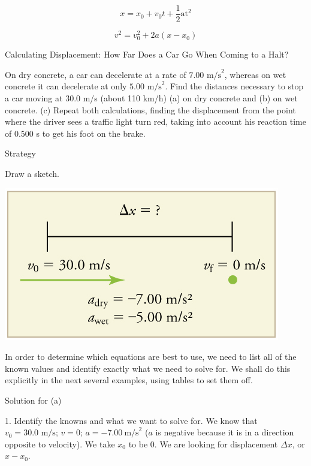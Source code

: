 \documentclass[
]{book}
\begin{document}
\leavevmode{}%
\[{{x = {x_{0} + v_{0}}}{t + \frac{1}{2}}\text{at}^{2}}{}\]

\leavevmode{}%
\[{{v^{2} = {v_{0}^{2} + 2a}}\left( {x - x_{0}} \right)}{}\]

\hypertarget{fs-id1164906424692}{}
Calculating Displacement: How Far Does a Car Go When Coming to a Halt?

On dry concrete, a car can decelerate at a rate of
\({7\text{.}\text{00\ m/s}^{2}}{}\), whereas on wet concrete it can
decelerate at only \({5\text{.}\text{00\ m/s}^{2}}{}\). Find the distances
necessary to stop a car moving at 30.0
m/s\emph{} (about 110 km/h) (a) on dry concrete
and (b) on wet concrete. (c) Repeat both calculations, finding the
displacement from the point where the driver sees a traffic light turn
red, taking into account his reaction time of 0.500 s to get his foot on
the brake.

{Strategy}

Draw a sketch.

\includegraphics{images/Figure_02_04_02c.jpg}

In order to determine which equations are best to use, we need to list
all of the known values and identify exactly what we need to solve for.
We shall do this explicitly in the next several examples, using tables
to set them off.

{Solution for (a)}

1. Identify the knowns and what we want to solve for. We know that
\({{v_{0} = \text{30}}\text{.}\text{0\ m/s}}{}\); \({v = \text{0}}{}\);
\({{a = {- 7}}\text{.}\text{00}\ \text{m/s}^{2}}{}\) (\(a\) is negative
because it is in a direction opposite to velocity). We take \(x_{0}{}\) to
be 0. We are looking for displacement \({\Delta x}{}\), or
\({x - x_{0}}{}\).
\end{document}
